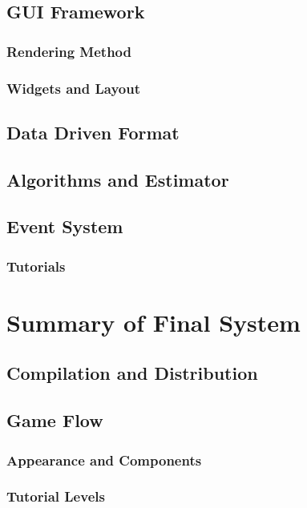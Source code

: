 \documentclass[msc,deptreport, cs]{infthesis}
\begin{document}
\section{GUI Framework}

\subsection{Rendering Method}

\subsection{Widgets and Layout}

\section{Data Driven Format} \label{sec:format}

\section{Algorithms and Estimator}

\section{Event System} \label{sec:event}

\subsection{Tutorials}

\chapter{Summary of Final System}

\section{Compilation and Distribution}

\section{Game Flow}

\subsection{Appearance and Components}

\subsection{Tutorial Levels}
\end{document}
